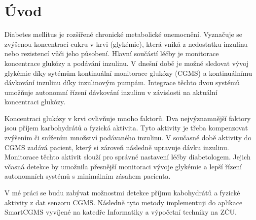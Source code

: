 \chapter{Úvod}

Diabetes mellitus je rozšířené chronické metabolické onemocnění. Vyznačuje se zvýšenou koncentrací cukru v krvi (glykémie), která vniká z nedostatku inzulinu nebo rezistencí vůči jeho působení. Hlavní součástí léčby je monitorace koncentrace glukózy a podávání inzulinu. V dnešní době je možné sledovat vývoj glykémie díky sytémům kontinuální monitorace glukózy (CGMS) a kontinuálnímu dávkování inzulinu díky inzulinovým pumpám. Integrace těchto dvou systémů umožňuje autonomní řízení dávkování inzulinu v závislosti na aktuální koncentraci glukózy.

Koncentraci glukózy v krvi ovlivňuje mnoho faktorů. Dva nejvýznamnější faktory jsou příjem karbohydrátů a fyzická aktivita. Tyto aktivity je třeba kompenzovat zvýšením či snížením množství podávaného inzulinu. V současné době aktivity do CGMS zadává pacient, který si zároveň následně upravuje dávku inzulinu. Monitorace těchto aktivit slouží pro správné nastavení léčby diabetologem. Jejich včasná detekce by umožnila přesnější monitoraci vývoje glykémie a lepší řízení autonomních systémů s minimálním zásahem pacienta.

V mé práci se budu zabývat možnostmi detekce příjmu kabohydrátů a fyzické aktivity z dat senzoru CGMS. Následně tyto metody implementuji do aplikace SmartCGMS vyvíjené na katedře Informatiky a výpočetní techniky na ZČU.